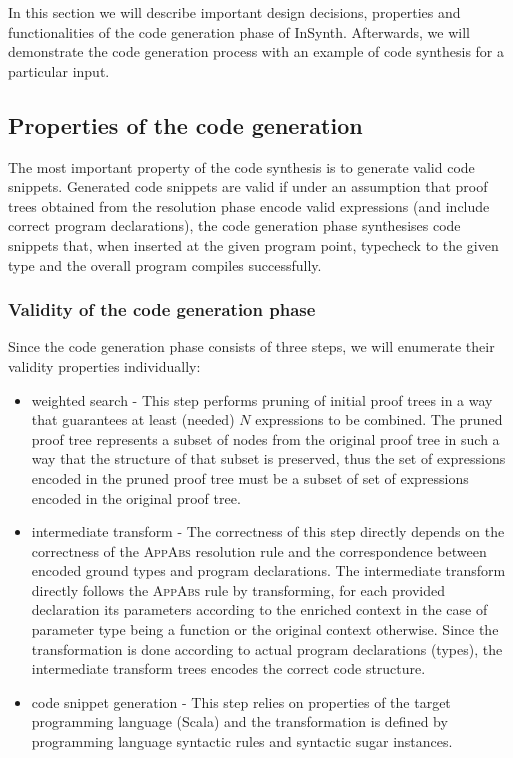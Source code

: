 In this section we will describe important design decisions, properties and functionalities of the code generation phase of InSynth.
Afterwards, we will demonstrate the code generation process with an example of code synthesis for a particular input. 

\subsection{Properties of the code generation}

The most important property of the code synthesis is to generate valid code snippets.
Generated code snippets are valid if under an assumption that proof trees obtained from the resolution phase encode valid expressions (and include correct program declarations), the code generation phase synthesises code snippets that, when inserted at the given program point, typecheck to the given type and the overall program compiles successfully.

\subsubsection{Validity of the code generation phase}

Since the code generation phase consists of three steps, we will enumerate their validity properties individually:
\begin{itemize}
\item weighted search - This step performs pruning of initial proof trees in a way that guarantees at least (needed) $N$ expressions to be combined. The pruned proof tree represents a subset of nodes from the original proof tree in such a way that the structure of that subset is preserved, thus the set of expressions encoded in the pruned proof tree must be a subset of set of expressions encoded in the original proof tree.
\item intermediate transform - The correctness of this step directly depends on the correctness of the \textsc{AppAbs} resolution rule and the correspondence between encoded ground types and program declarations. The intermediate transform directly follows the \textsc{AppAbs} rule by transforming, for each provided declaration its parameters according to the enriched context in the case of parameter type being a function or the original context otherwise. Since the transformation is done according to actual program declarations (types), the intermediate transform trees encodes the correct code structure.
\item code snippet generation - This step relies on properties of the target programming language (Scala) and the transformation is defined by programming language syntactic rules and syntactic sugar instances.
\end{itemize} 

